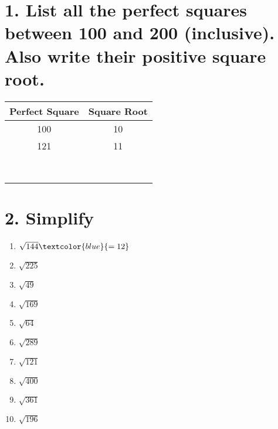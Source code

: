 \documentclass{hw}
\begin{document}
\section*{\normalsize 1. List all the perfect squares between 100 and 200 (inclusive). Also write their positive square root.}
\renewcommand{\arraystretch}{2} %
\begin{center}
\begin{tabular}{|c|c|}
    \hline
    Perfect Square & Square Root \\
    \hline
    100 & 10 \\
    \hline
    121 & 11 \\
    \hline
    & \\
    \hline
    & \\
    \hline
    & \\
    \hline
    & \\
    \hline
    & \\
    \hline
    & \\
    \hline
    & \\
    \hline
    & \\
    \hline
\end{tabular}
\end{center}


\section*{\normalsize 2. Simplify}
\begin{enumerate}[label=\alph*.]
    \item $\sqrt{144} \textcolor{blue}{= 12}$
        \studentsmallworkspace
    \item $\sqrt{225}$
        \studentsmallworkspace
    \item $\sqrt{49}$
        \studentsmallworkspace
    \item $\sqrt{169}$
        \studentsmallworkspace
    \item $\sqrt{64}$
        \studentsmallworkspace
    \item $\sqrt{289}$
        \studentsmallworkspace
    \item $\sqrt{121}$
        \studentsmallworkspace
    \item $\sqrt{400}$
        \studentsmallworkspace
    \item $\sqrt{361}$
        \studentsmallworkspace
    \item $\sqrt{196}$
        \studentsmallworkspace
\end{enumerate}
\end{document}
